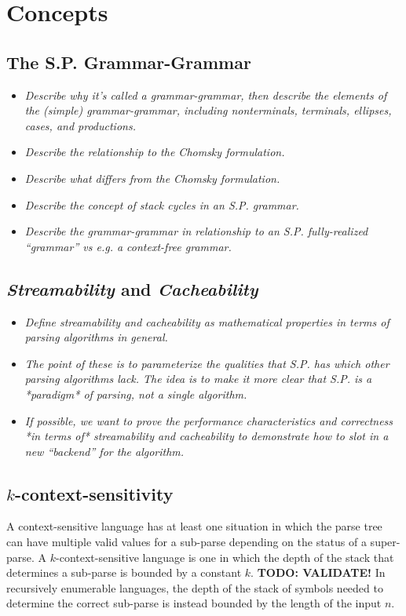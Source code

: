 \documentclass{article}
\begin{document}
\section{Concepts}
\subsection{The S.P. Grammar-Grammar}
\begin{itemize}
  \item \textit{Describe why it's called a grammar-grammar, then describe the elements of the (simple) grammar-grammar, including nonterminals, terminals, ellipses, cases, and productions.}
  \item \textit{Describe the relationship to the Chomsky formulation.}
  \item \textit{Describe what differs from the Chomsky formulation.}
  \item \textit{Describe the concept of stack cycles in an S.P. grammar.}
  \item \textit{Describe the grammar-grammar in relationship to an S.P. fully-realized ``grammar'' vs e.g. a context-free grammar.}
\end{itemize}

\subsection{\textit{Streamability} and \textit{Cacheability}}
\begin{itemize}
  \item \textit{Define streamability and cacheability as mathematical properties in terms of parsing algorithms in general.}
  \item \textit{The point of these is to parameterize the qualities that S.P. has which other parsing algorithms lack. The idea is to make it more clear that S.P. is a *paradigm* of parsing, not a single algorithm.}
  \item \textit{If possible, we want to prove the performance characteristics and correctness *in terms of* streamability and cacheability to demonstrate how to slot in a new ``backend'' for the algorithm.}
\end{itemize}

\subsection{$k$-context-sensitivity}
A context-sensitive language has at least one situation in which the parse tree can have multiple valid values for a sub-parse depending on the status of a super-parse. A $k$-context-sensitive language is one in which the depth of the stack that determines a sub-parse is bounded by a constant $k$. \textbf{TODO: VALIDATE!} In recursively enumerable languages, the depth of the stack of symbols needed to determine the correct sub-parse is instead bounded by the length of the input $n$.
\end{document}
